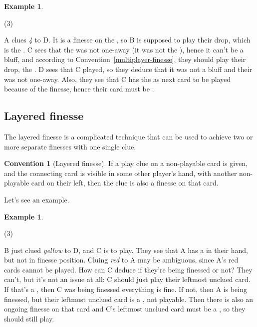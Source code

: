\documentclass[a4paper]{article}
\theoremstyle{plain}
\theoremstyle{definition}
\newtheorem{example}[theorem]{Example}
\newtheorem{convention}[theorem]{Convention}
\begin{document}
\begin{example}
	\hfill
	\begin{tasks}(3)
		\task[+]      
		\task[A]    
		\task[B]    
		\task[C]    
		\task[D]    
		\task[E]    
	\end{tasks}
	
	A clues \textit{4} to D. It is a finesse on the , so B is supposed to play their drop, which is the . C sees that the  was not one-away (it was not the ), hence it can't be a bluff, and according to Convention~\ref{multiplayer-finesse}, they should play their drop, the . D sees that C played, so they deduce that it was not a bluff and their  was not one-away. Also, they see that C has the  as next card to be played because of the finesse, hence their card must be .
\end{example}

\subsection{Layered finesse}

The layered finesse is a complicated technique that can be used to achieve two or more separate finesses with one single clue.

\begin{convention}[Layered finesse]
	\label{layered-finesse}
	If a play clue on a non-playable card is given, and the connecting card is visible in some other player's hand, with another non-playable card on their left, then the clue is also a finesse on that card.
\end{convention}

Let's see an example.

\begin{example}
	\hfill	
	\begin{tasks}(3)
		\task[+]      
		\task[A]    
		\task[B]    
		\task[C]     
		\task[D]    
		\task[E]    
	\end{tasks}
	
	B just clued \textit{yellow} to D, and C is to play. They see that A has a  in their hand, but not in finesse position. Cluing \textit{red} to A may be ambiguous, since A's red cards cannot be played. How can C deduce if they're being finessed or not? They can't, but it's not an issue at all: C should just play their leftmost unclued card. If that's a , then C was being finessed everything is fine. If not, then A is being finessed, but their leftmost unclued card is a , not playable. Then there is also an ongoing finesse on that card and C's leftmost unclued card must be a , so they should still play.	
\end{example}
\end{document}
